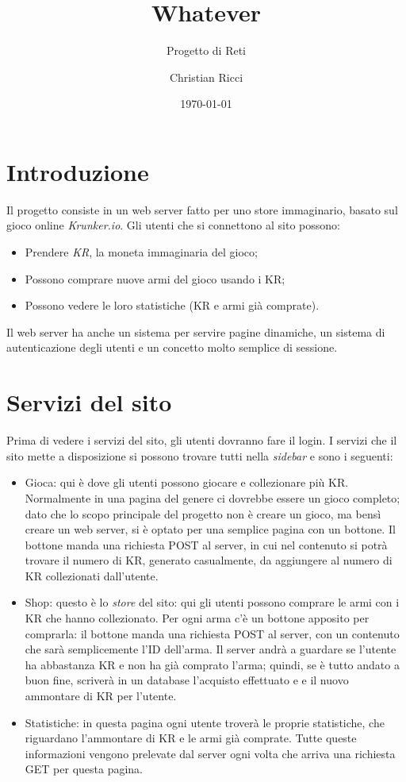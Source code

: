 \documentclass[a4paper,12pt]{report}
\title{Whatever}
\subtitle{Progetto di Reti}
\author{Christian Ricci}
\date{\today}
\begin{document}
\maketitle
\tableofcontents

\chapter{Introduzione}

Il progetto consiste in un web server fatto per uno store immaginario, basato sul gioco online \textit{Krunker.io}. Gli utenti che si connettono al sito possono: 
\begin{itemize}
\item Prendere \textit{KR}, la moneta immaginaria del gioco;
\item Possono comprare nuove armi del gioco usando i KR;
\item Possono vedere le loro statistiche (KR e armi già comprate).
\end{itemize}
Il web server ha anche un sistema per servire pagine dinamiche, un sistema di autenticazione degli utenti e un concetto molto semplice di sessione.

\chapter{Servizi del sito}

Prima di vedere i servizi del sito, gli utenti dovranno fare il login. I servizi che il sito mette a disposizione si possono trovare tutti nella \textit{sidebar} e sono i seguenti:
\begin{itemize}
\item Gioca: qui è dove gli utenti possono giocare e collezionare più KR. Normalmente in una pagina del genere ci dovrebbe essere un gioco completo; dato che lo scopo principale del progetto non è creare un gioco, ma bensì creare un web server, si è optato per una semplice pagina con un bottone. Il bottone manda una richiesta POST al server, in cui nel contenuto si potrà trovare il numero di KR, generato casualmente, da aggiungere al numero di KR collezionati dall'utente.
\item Shop: questo è lo \textit{store} del sito: qui gli utenti possono comprare le armi con i KR che hanno collezionato. Per ogni arma c'è un bottone apposito per comprarla: il bottone manda una richiesta POST al server, con un contenuto che sarà semplicemente l'ID dell'arma. Il server andrà a guardare se l'utente ha abbastanza KR e non ha già comprato l'arma; quindi, se è tutto andato a buon fine, scriverà in un database l'acquisto effettuato e e il nuovo ammontare di KR per l'utente.
\item Statistiche: in questa pagina ogni utente troverà le proprie statistiche, che riguardano l'ammontare di KR e le armi già comprate. Tutte queste informazioni vengono prelevate dal server ogni volta che arriva una richiesta GET per questa pagina.
\end{itemize}
\end{document}
